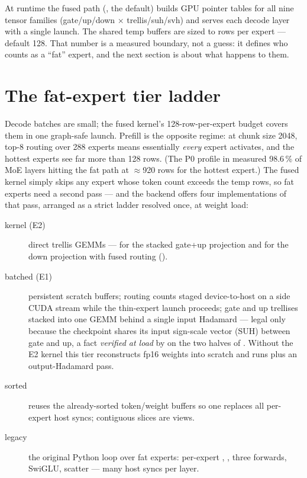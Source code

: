 At runtime the fused path (, the default) builds
GPU pointer tables for all nine tensor families (gate/up/down $\times$
trellis/suh/svh) and serves each decode layer with a single
 launch. The shared temp buffers are sized to
 rows per expert --- default 128. That number
is a measured boundary, not a guess: it defines who counts as a ``fat''
expert, and the next section is about what happens to them.

\section{The fat-expert tier ladder}
\label{sec:qbet-tiers}

Decode batches are small; the fused kernel's 128-row-per-expert budget covers
them in one graph-safe launch. Prefill is the opposite regime: at chunk size
2048, top-8 routing over 288 experts means essentially \emph{every} expert
activates, and the hottest experts see far more than 128 rows. (The P0
profile in  measured 98.6\,\% of MoE layers hitting
the fat path at $\approx$920 rows for the hottest expert.) The fused kernel
simply skips any expert whose token count exceeds the temp rows, so fat
experts need a second pass --- and the backend offers four implementations of
that pass, arranged as a strict ladder resolved once, at weight load:

\begin{description}
  \item[kernel (E2)] direct trellis GEMMs ---  for
    the stacked gate+up projection and  for
    the down projection with fused routing ().
  \item[batched (E1)] persistent scratch buffers; routing counts staged
    device-to-host on a side CUDA stream while the thin-expert launch
    proceeds; gate and up trellises stacked into one GEMM behind a single
    input Hadamard --- legal only because the checkpoint shares its input
    sign-scale vector (SUH) between gate and up, a fact \emph{verified at
    load} by  on the two halves of .
    Without the E2 kernel this tier reconstructs fp16 weights into scratch
    and runs  plus an output-Hadamard pass.
  \item[sorted] reuses the already-sorted token/weight buffers so one
     replaces all per-expert host syncs; contiguous
    slices are views.
  \item[legacy] the original Python loop over fat experts: per-expert
    , , three 
    forwards, SwiGLU,  scatter --- many host syncs per
    layer.
\end{description}

